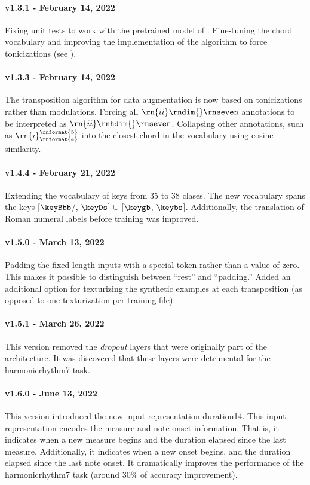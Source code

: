\paragraph{v1.3.1 - February 14, 2022}
Fixing unit tests to work with the pretrained model of
. Fine-tuning the chord vocabulary and
improving the implementation of the algorithm to force
tonicizations (see ).

\paragraph{v1.3.3 - February 14, 2022}
The transposition algorithm for data augmentation is now
based on tonicizations rather than modulations. Forcing all
$\rn{ii}\rndim{}\rnseven$ annotations to be interpreted as
$\rn{ii}\rnhdim{}\rnseven$. Collapsing other annotations,
such as $\rn{i}^{\rnformat{5}}_{\rnformat{4}}$ into the
closest chord in the vocabulary using cosine similarity.

\paragraph{v1.4.4 - February 21, 2022}
Extending the vocabulary of keys from 35 to 38 clases. The
new vocabulary spans the keys [$\keyBbb$/, $\keyDs$] $\cup$
[$\keygb$, $\keybs$]. Additionally, the translation of Roman
numeral labels before training was improved.

\paragraph{v1.5.0 - March 13, 2022}
Padding the fixed-length inputs with a special token rather
than a value of zero. This makes it possible to distinguish
between ``rest'' and ``padding.'' Added an additional option
for texturizing the synthetic examples at each transposition
(as opposed to one texturization per training file).

\paragraph{v1.5.1 - March 26, 2022}
This version removed the \emph{dropout} layers
\parencite{dahl2013improving} that were originally part of
the architecture. It was discovered that these layers were
detrimental for the \gls{harmonicrhythm7} task.

\paragraph{v1.6.0 - June 13, 2022}
This version introduced the new input representation
\gls{duration14}. This input representation encodes the
measure-and note-onset information. That is, it indicates
when a new measure begins and the duration elapsed since the
last measure. Additionally, it indicates when a new onset
begins, and the duration elapsed since the last note onset.
It dramatically improves the performance of the
\gls{harmonicrhythm7} task (around 30\% of accuracy
improvement).

